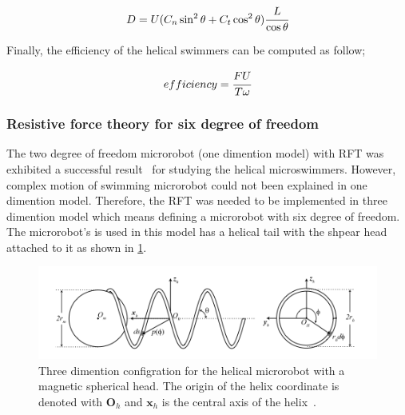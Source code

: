 \documentclass[12pt,a4paper,titlepage]{report}
\begin{document}
\begin{equation}
 D = U (C_n \sin ^2 \theta + C_t \cos ^2 \theta) \cfrac{L}{\cos \theta} 
\label{drag}
\end{equation}



Finally, the efficiency of the helical swimmers can be computed as follow;



\begin{equation}
 efficiency = \cfrac{FU}{T \omega} 
\label{efficiency}
\end{equation}

 
\subsubsection{Resistive force theory for six degree of freedom}\label{}
 
The two degree of freedom microrobot (one dimention model) with \ac*{RFT} was exhibited a successful result~\citep{mahoney2011velocity}
for studying the helical microswimmers. However, complex motion of swimming microrobot could not been 
explained in one dimention model. Therefore, the \ac*{RFT} was needed to be implemented in three dimention
model which means defining a microrobot with six degree of freedom. The microrobot\rq{}s is
used in this model has a helical tail with the shpear head attached to it as shown in \ref{RFT-6dof}.

\begin{figure}
  \centering
    \includegraphics[width=1.0\textwidth]{RFT-6dof}
  \caption{Three dimention configration for the helical microrobot with a magnetic spherical head. The origin
of the helix coordinate is denoted with $\bm{O}_h$ and $\bm{x}_{h}$ is the central axis of the
 helix~\citep{mahoney2011velocity}.}
  \label{RFT-6dof}
\end{figure}
\end{document}
